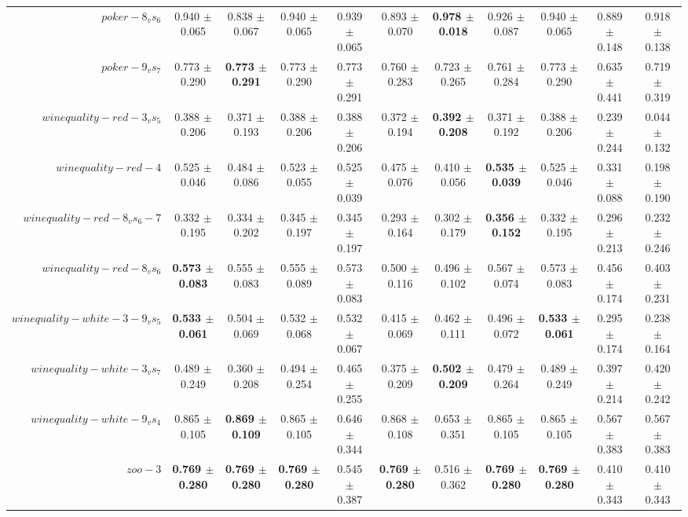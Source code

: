 \begin{table}[!ht]
{\begin{tabular}{r c c c c c c c c c c}
$poker-8_vs_6$ & 0.940 $\pm$ 0.065 & 0.838 $\pm$ 0.067 & 0.940 $\pm$ 0.065 & 0.939 $\pm$ 0.065 & 0.893 $\pm$ 0.070 & \textbf{0.978 $\pm$ 0.018} & 0.926 $\pm$ 0.087 & 0.940 $\pm$ 0.065 & 0.889 $\pm$ 0.148 & 0.918 $\pm$ 0.138 \\
$poker-9_vs_7$ & 0.773 $\pm$ 0.290 & \textbf{0.773 $\pm$ 0.291} & 0.773 $\pm$ 0.290 & 0.773 $\pm$ 0.291 & 0.760 $\pm$ 0.283 & 0.723 $\pm$ 0.265 & 0.761 $\pm$ 0.284 & 0.773 $\pm$ 0.290 & 0.635 $\pm$ 0.441 & 0.719 $\pm$ 0.319 \\
$winequality-red-3_vs_5$ & 0.388 $\pm$ 0.206 & 0.371 $\pm$ 0.193 & 0.388 $\pm$ 0.206 & 0.388 $\pm$ 0.206 & 0.372 $\pm$ 0.194 & \textbf{0.392 $\pm$ 0.208} & 0.371 $\pm$ 0.192 & 0.388 $\pm$ 0.206 & 0.239 $\pm$ 0.244 & 0.044 $\pm$ 0.132 \\
$winequality-red-4$ & 0.525 $\pm$ 0.046 & 0.484 $\pm$ 0.086 & 0.523 $\pm$ 0.055 & 0.525 $\pm$ 0.039 & 0.475 $\pm$ 0.076 & 0.410 $\pm$ 0.056 & \textbf{0.535 $\pm$ 0.039} & 0.525 $\pm$ 0.046 & 0.331 $\pm$ 0.088 & 0.198 $\pm$ 0.190 \\
$winequality-red-8_vs_6-7$ & 0.332 $\pm$ 0.195 & 0.334 $\pm$ 0.202 & 0.345 $\pm$ 0.197 & 0.345 $\pm$ 0.197 & 0.293 $\pm$ 0.164 & 0.302 $\pm$ 0.179 & \textbf{0.356 $\pm$ 0.152} & 0.332 $\pm$ 0.195 & 0.296 $\pm$ 0.213 & 0.232 $\pm$ 0.246 \\
$winequality-red-8_vs_6$ & \textbf{0.573 $\pm$ 0.083} & 0.555 $\pm$ 0.083 & 0.555 $\pm$ 0.089 & 0.573 $\pm$ 0.083 & 0.500 $\pm$ 0.116 & 0.496 $\pm$ 0.102 & 0.567 $\pm$ 0.074 & 0.573 $\pm$ 0.083 & 0.456 $\pm$ 0.174 & 0.403 $\pm$ 0.231 \\
$winequality-white-3-9_vs_5$ & \textbf{0.533 $\pm$ 0.061} & 0.504 $\pm$ 0.069 & 0.532 $\pm$ 0.068 & 0.532 $\pm$ 0.067 & 0.415 $\pm$ 0.069 & 0.462 $\pm$ 0.111 & 0.496 $\pm$ 0.072 & \textbf{0.533 $\pm$ 0.061} & 0.295 $\pm$ 0.174 & 0.238 $\pm$ 0.164 \\
$winequality-white-3_vs_7$ & 0.489 $\pm$ 0.249 & 0.360 $\pm$ 0.208 & 0.494 $\pm$ 0.254 & 0.465 $\pm$ 0.255 & 0.375 $\pm$ 0.209 & \textbf{0.502 $\pm$ 0.209} & 0.479 $\pm$ 0.264 & 0.489 $\pm$ 0.249 & 0.397 $\pm$ 0.214 & 0.420 $\pm$ 0.242 \\
$winequality-white-9_vs_4$ & 0.865 $\pm$ 0.105 & \textbf{0.869 $\pm$ 0.109} & 0.865 $\pm$ 0.105 & 0.646 $\pm$ 0.344 & 0.868 $\pm$ 0.108 & 0.653 $\pm$ 0.351 & 0.865 $\pm$ 0.105 & 0.865 $\pm$ 0.105 & 0.567 $\pm$ 0.383 & 0.567 $\pm$ 0.383 \\
$zoo-3$ & \textbf{0.769 $\pm$ 0.280} & \textbf{0.769 $\pm$ 0.280} & \textbf{0.769 $\pm$ 0.280} & 0.545 $\pm$ 0.387 & \textbf{0.769 $\pm$ 0.280} & 0.516 $\pm$ 0.362 & \textbf{0.769 $\pm$ 0.280} & \textbf{0.769 $\pm$ 0.280} & 0.410 $\pm$ 0.343 & 0.410 $\pm$ 0.343 \\

\end{tabular}}
\end{table}
